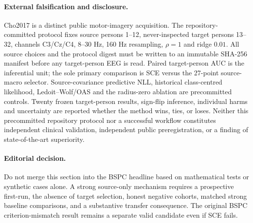 \paragraph{External falsification and disclosure.}
Cho2017 is a distinct public motor-imagery acquisition.
The repository-committed protocol fixes source persons 1--12,
never-inspected target persons 13--32, channels C3/Cz/C4, 8--30 Hz,
160 Hz resampling, $\rho=1$ and ridge $0.01$.
All source choices and the protocol digest must be written to
an immutable SHA-256 manifest before any target-person EEG is read.
Paired target-person AUC is the inferential unit; the sole primary
comparison is SCE versus the 27-point source-macro selector.
Source-covariance predictive NLL, historical class-centred
likelihood, Ledoit--Wolf/OAS and the radius-zero ablation are
precommitted controls. Twenty frozen target-person results,
sign-flip inference, individual harms and uncertainty are reported
whether the method wins, ties, or loses.
Neither this precommitted repository protocol nor a successful
workflow constitutes independent clinical validation, independent
public preregistration, or a finding of state-of-the-art superiority.

\paragraph{Editorial decision.}
Do not merge this section into the BSPC headline based on
mathematical tests or synthetic cases alone. A strong source-only
mechanism requires a prospective first-run, the absence of target
selection, honest negative cohorts, matched strong baseline
comparisons, and a substantive transfer consequence.
The original BSPC criterion-mismatch result remains a separate
valid candidate even if SCE fails.
